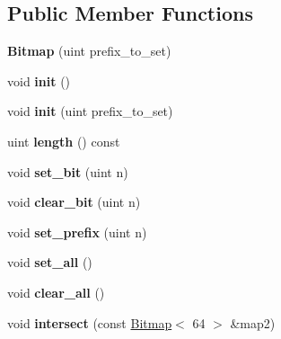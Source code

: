 \subsection*{Public Member Functions}
\begin{DoxyCompactItemize}
\item 
\mbox{\label{classBitmap_3_0164_01_4_a0c78cfd75526b9ddfcbcf8c678dc387c}} 
{\bfseries Bitmap} (uint prefix\+\_\+to\+\_\+set)
\item 
\mbox{\label{classBitmap_3_0164_01_4_ad3551a0744352f426f672f4431c5bad7}} 
void {\bfseries init} ()
\item 
\mbox{\label{classBitmap_3_0164_01_4_a376438eff96af1f64c702e243ba338a8}} 
void {\bfseries init} (uint prefix\+\_\+to\+\_\+set)
\item 
\mbox{\label{classBitmap_3_0164_01_4_a816b9fc7cd376d63e4bc7251abbfda78}} 
uint {\bfseries length} () const
\item 
\mbox{\label{classBitmap_3_0164_01_4_a4376f271ef937d5877be77866cc5eb2c}} 
void {\bfseries set\+\_\+bit} (uint n)
\item 
\mbox{\label{classBitmap_3_0164_01_4_af6461063ba5f3cc8ae87fdc9adb3a1c5}} 
void {\bfseries clear\+\_\+bit} (uint n)
\item 
\mbox{\label{classBitmap_3_0164_01_4_a84ed2f9f7148d0dfc106a9bcec25884e}} 
void {\bfseries set\+\_\+prefix} (uint n)
\item 
\mbox{\label{classBitmap_3_0164_01_4_a1f918d9feff9ef3f97ddace07e49c4e1}} 
void {\bfseries set\+\_\+all} ()
\item 
\mbox{\label{classBitmap_3_0164_01_4_a39da917b03178b94c4879a2a6f9c241d}} 
void {\bfseries clear\+\_\+all} ()
\item 
\mbox{\label{classBitmap_3_0164_01_4_a382cda4dd286184a33003b8c47905d57}} 
void {\bfseries intersect} (const \mbox{\hyperlink{classBitmap}{Bitmap}}$<$ 64 $>$ \&map2)

\end{DoxyCompactItemize}
